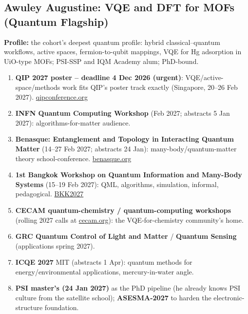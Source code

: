 \documentclass[11pt,a4paper]{article}
\begin{document}
\subsection{Awuley Augustine: VQE and DFT for MOFs (Quantum Flagship)}
\textbf{Profile:} the cohort's deepest quantum profile: hybrid classical--quantum workflows, active spaces, fermion-to-qubit mappings, VQE for Hg adsorption in UiO-type MOFs; PSI-SSP and IQM Academy alum; PhD-bound.
\begin{enumerate}[leftmargin=1.6em]
  \item \textbf{QIP 2027 poster -- deadline 4 Dec 2026 (urgent)}: VQE/active-space/methods work fits QIP's poster track exactly (Singapore, 20--26 Feb 2027). \href{https://qipconference.org/2027/call/}{qipconference.org}
  \item \textbf{INFN Quantum Computing Workshop} (Feb 2027; abstracts 5 Jan 2027): algorithms-for-matter audience.
  \item \textbf{Benasque: Entanglement and Topology in Interacting Quantum Matter} (14--27 Feb 2027; abstracts 24 Jan): many-body/quantum-matter theory school-conference. \href{https://www.benasque.org/2027etqm/}{benasque.org}
  \item \textbf{1st Bangkok Workshop on Quantum Information and Many-Body Systems} (15--19 Feb 2027): QML, algorithms, simulation, informal, pedagogical. \href{https://www.thaihep.phys.sc.chula.ac.th/BKK2027QIMB/}{BKK2027}
  \item \textbf{CECAM quantum-chemistry / quantum-computing workshops} (rolling 2027 calls at \href{https://www.cecam.org/program}{cecam.org}): the VQE-for-chemistry community's home.
  \item \textbf{GRC Quantum Control of Light and Matter} / \textbf{Quantum Sensing} (applications spring 2027).
  \item \textbf{ICQE 2027} MIT (abstracts 1 Apr): quantum methods for energy/environmental applications, mercury-in-water angle.
  \item \textbf{PSI master's (24 Jan 2027)} as the PhD pipeline (he already knows PSI culture from the satellite school); \textbf{ASESMA-2027} to harden the electronic-structure foundation.
\end{enumerate}
\end{document}
